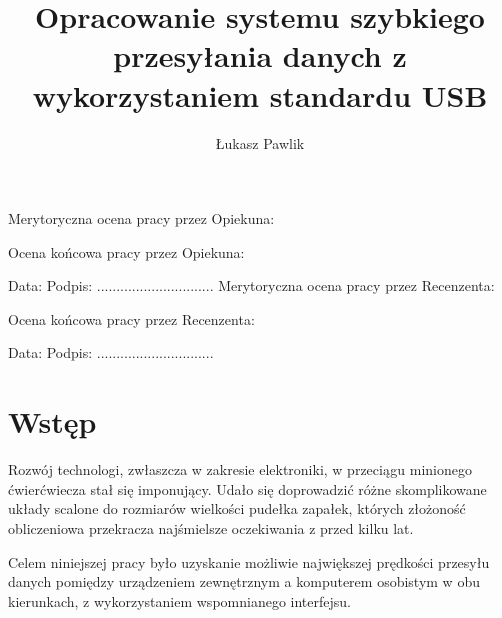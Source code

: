 \documentclass{BscUS}
\title{Opracowanie systemu szybkiego przesyłania danych z wykorzystaniem standardu USB}
\author{Łukasz Pawlik}
\begin{document}
\pagestyle{plain}

\maketitle

\makestatement

\newpage
\thispagestyle{plain}
Merytoryczna ocena pracy przez Opiekuna:


Ocena końcowa pracy przez Opiekuna: 

\hspace{2cm} Data: \hspace{6cm}  Podpis: ..............................
\pagebreak
\newpage
\thispagestyle{plain}
Merytoryczna ocena pracy przez Recenzenta:


Ocena końcowa pracy przez Recenzenta: 

\hspace{2cm} Data: \hspace{6cm}  Podpis: ..............................
\pagebreak
\newpage
\thispagestyle{plain}


\clearpage
\tableofcontents

\newpage


\chapter{Wstęp}
\label{beginChapter}
\pagestyle{fancy}
Rozwój technologi, zwłaszcza w zakresie elektroniki, w przeciągu minionego ćwierćwiecza stał się imponujący. Udało się doprowadzić różne skomplikowane układy scalone do rozmiarów wielkości pudełka zapałek, których złożoność obliczeniowa przekracza najśmielsze oczekiwania z przed kilku lat. 

Celem niniejszej pracy było uzyskanie możliwie największej prędkości przesyłu danych pomiędzy urządzeniem zewnętrznym a komputerem osobistym w obu kierunkach, z wykorzystaniem wspomnianego interfejsu. 
\end{document}
